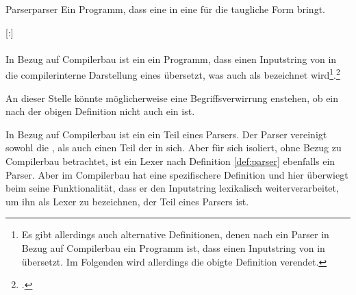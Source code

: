 \begin{Definition}{Parser}{parser}
  Ein Programm, dass eine  in eine für die  taugliche Form bringt.

  \setcounter{subdefcounter}{1}

  \titleformat{\paragraph}[runin]{\normalfont\normalsize\bfseries}{}{0mm}{}[:]

  \paragraph{\thesubdefcounter}\label{par:parser}
  In Bezug auf Compilerbau ist ein  ein Programm, dass einen Inputstring von  in die compilerinterne Darstellung eines  übersetzt, was auch als   bezeichnet wird\footnote{Es gibt allerdings auch alternative Definitionen, denen nach ein Parser in Bezug auf Compilerbau ein Programm ist, dass einen Inputstring von  in   übersetzt. Im Folgenden wird allerdings die obigte Definition  verendet.}.\footcite{noauthor_compiler_nodate}
\end{Definition}

\begin{Special_Paragraph}
  An dieser Stelle könnte möglicherweise eine Begriffsverwirrung enstehen, ob ein  nach der obigen Definition nicht auch ein  ist.

  In Bezug auf Compilerbau ist ein  ein Teil eines Parsers. Der Parser vereinigt sowohl die , als auch einen Teil der  in sich. Aber für sich isoliert, ohne Bezug zu Compilerbau betrachtet, ist ein Lexer nach Definition \ref{def:parser} ebenfalls ein Parser. Aber im Compilerbau hat  eine spezifischere Definition und hier überwiegt beim  seine Funktionalität, dass er den Inputstring lexikalisch weiterverarbeitet, um ihn als Lexer zu bezeichnen, der Teil eines Parsers ist.
\end{Special_Paragraph}

